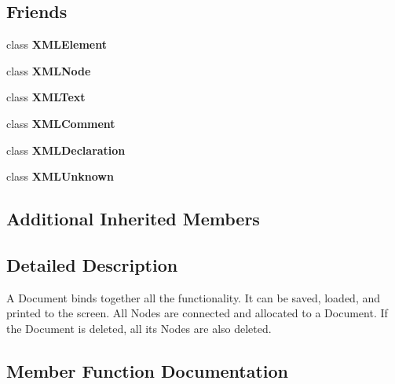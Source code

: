 \subsection*{Friends}
\begin{DoxyCompactItemize}
\item 
\mbox{\label{classtinyxml2_1_1XMLDocument_ac2fba9b6e452829dd892f7392c24e0eb}} 
class {\bfseries X\+M\+L\+Element}
\item 
\mbox{\label{classtinyxml2_1_1XMLDocument_a8233f9dc4d61d90e93be2a3647c6d957}} 
class {\bfseries X\+M\+L\+Node}
\item 
\mbox{\label{classtinyxml2_1_1XMLDocument_ae50b59416e98bbe7e4bc87df40092109}} 
class {\bfseries X\+M\+L\+Text}
\item 
\mbox{\label{classtinyxml2_1_1XMLDocument_acee9e261162d4236fb2c30312c54cd4c}} 
class {\bfseries X\+M\+L\+Comment}
\item 
\mbox{\label{classtinyxml2_1_1XMLDocument_a93d2c2c2db3973083b7d6e7f6f358160}} 
class {\bfseries X\+M\+L\+Declaration}
\item 
\mbox{\label{classtinyxml2_1_1XMLDocument_a6946948274f7a02f5e69b5dbeaea9b35}} 
class {\bfseries X\+M\+L\+Unknown}
\end{DoxyCompactItemize}
\subsection*{Additional Inherited Members}


\subsection{Detailed Description}
A Document binds together all the functionality. It can be saved, loaded, and printed to the screen. All Nodes are connected and allocated to a Document. If the Document is deleted, all its Nodes are also deleted. 

\subsection{Member Function Documentation}
\mbox{\label{classtinyxml2_1_1XMLDocument_a9efa54f7ecb37c17ab1fa2b3078ccca1}} 
